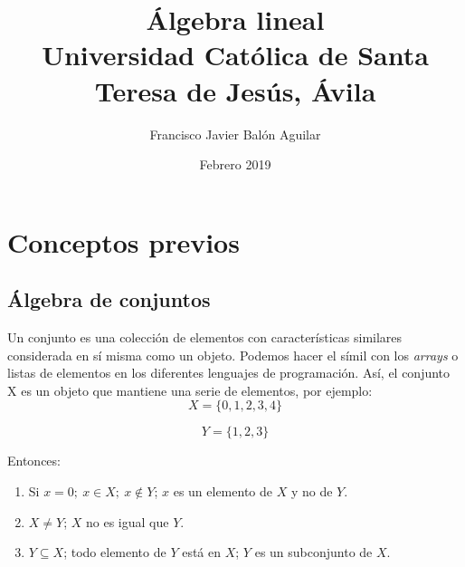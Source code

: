 \documentclass[11pt, oneside, titlepage]{article}
\title{\textbf{Álgebra lineal}\\ Universidad Católica de Santa Teresa de Jesús, Ávila}
\author{Francisco Javier Balón Aguilar}
\date{Febrero 2019}
\begin{document}
\maketitle
\tableofcontents
\newpage

\section{Conceptos previos}
\subsection{Álgebra de conjuntos}
Un conjunto es una colección de elementos con características similares considerada en sí misma como un objeto. Podemos hacer el símil con los \emph{arrays} o listas de elementos en los diferentes lenguajes de programación. Así, el conjunto X es un objeto que mantiene una serie de elementos, por ejemplo:
\[
X=\{0, 1, 2, 3, 4\}
\]

\[
Y=\{1, 2, 3\}
\]

Entonces:
\begin{enumerate}
\item Si $x = 0;\ x \in X;\ x \notin Y$; $x$ es un elemento de $X$ y no de $Y$. 
\item $X \neq Y$; $X$ no es igual que $Y$.
\item $Y \subseteq X$; todo elemento de $Y$ está en $X$; $Y$ es un subconjunto de $X$.
\end{enumerate}
\end{document}
